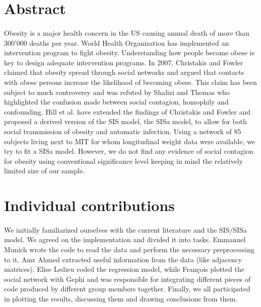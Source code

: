 \documentclass[11pt]{article}
\begin{document}
\newpage


\tableofcontents

\newpage




\section{Abstract}
\paragraph{}
Obesity is a major health concern in the US causing annual death of more than 300'000 deaths per year. World Health Organization has implemented an intervention program to fight obesity.  Understanding how people become obese is key to design adequate intervention programs. In 2007, Christakis and Fowler claimed that obesity spread through social networks and argued that contacts with obese persons increase the likelihood of becoming obese. This claim has been subject to much controversy and was refuted by Shalizi and Thomas who highlighted the confusion made between social contagion, homophily and confounding.  Hill et al. have extended the findings of Christakis and Fowler and proposed a derived version of the SIS model, the SISa model, to allow for both social transmission of obesity and automatic infection. Using a network of 85 subjects living next to MIT for whom longitudinal weight data were available, we try to fit a SISa model. However, we do not find any evidence of social contagion for obesity using conventional significance level keeping in mind the relatively limited size of our sample.
\pagebreak

\section{Individual contributions}
\paragraph{}
We initially familiarized ourselves with the current literature and the SIS/SISa model. We agreed on the implementation and divided it into tasks. Emmanuel Munich wrote the code to read the data and perform the necessary preprocessing to it. Amr Ahmed extracted useful information from the data (like adjacency matrices). Elise Ledieu coded the regression model, while Fran\c{c}ois plotted the social network with Gephi and was responsible for integrating different pieces of code produced by different group members together. Finally, we all participated in plotting the results, discussing them and drawing conclusions from them.
\pagebreak
\end{document}
